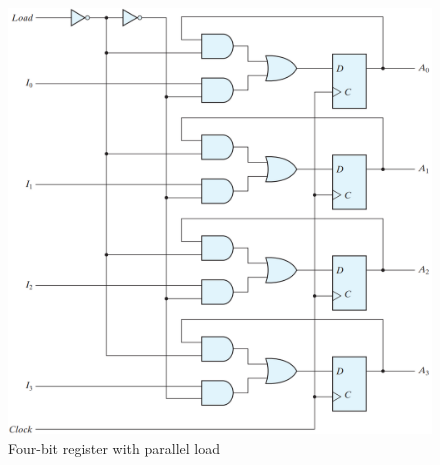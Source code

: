 \begin{figure}[H]
  \centering
  \includegraphics[width=\linewidth]{img/fig-6.2.png}
  \caption{Four-bit register with parallel load}
  \label{fig:6.2}
\end{figure}
